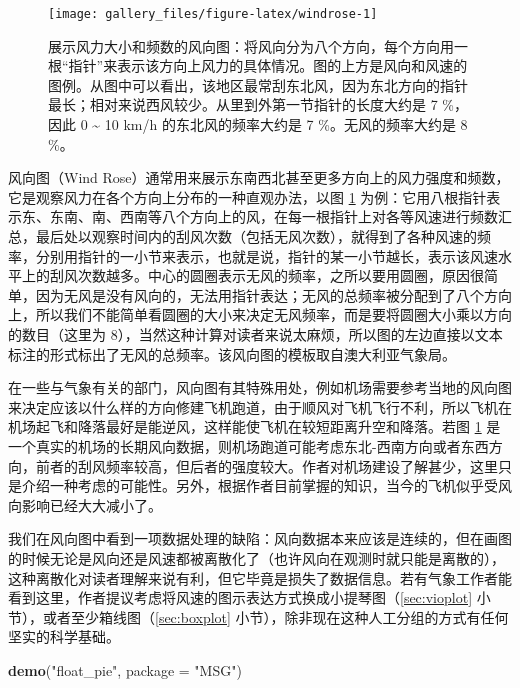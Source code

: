 \documentclass[
  b5paper,
  UTF8,twoside]{book}
\newenvironment{Shaded}{\begin{snugshade}}{\end{snugshade}}
\newcommand{\AttributeTok}[1]{\textcolor[rgb]{0.13,0.29,0.53}{#1}}
\newcommand{\FunctionTok}[1]{\textcolor[rgb]{0.13,0.29,0.53}{\textbf{#1}}}
\newcommand{\NormalTok}[1]{#1}
\newcommand{\StringTok}[1]{\textcolor[rgb]{0.31,0.60,0.02}{#1}}
\begin{document}
\begin{figure}

{\centering \texttt{[image: gallery\_files/figure-latex/windrose-1]} 

}

\caption[展示风力大小和频数的风向图]{展示风力大小和频数的风向图：将风向分为八个方向，每个方向用一根``指针''来表示该方向上风力的具体情况。图的上方是风向和风速的图例。从图中可以看出，该地区最常刮东北风，因为东北方向的指针最长；相对来说西风较少。从里到外第一节指针的长度大约是 7 \%，因此 0 \textasciitilde{} 10 km/h 的东北风的频率大约是 7 \%。无风的频率大约是 8 \%。}\label{fig:windrose}
\end{figure}

风向图（Wind Rose）通常用来展示东南西北甚至更多方向上的风力强度和频数，它是观察风力在各个方向上分布的一种直观办法，以图 \ref{fig:windrose}
为例：它用八根指针表示东、东南、南、西南等八个方向上的风，在每一根指针上对各等风速进行频数汇总，最后处以观察时间内的刮风次数（包括无风次数），就得到了各种风速的频率，分别用指针的一小节来表示，也就是说，指针的某一小节越长，表示该风速水平上的刮风次数越多。中心的圆圈表示无风的频率，之所以要用圆圈，原因很简单，因为无风是没有风向的，无法用指针表达；无风的总频率被分配到了八个方向上，所以我们不能简单看圆圈的大小来决定无风频率，而是要将圆圈大小乘以方向的数目（这里为 8），当然这种计算对读者来说太麻烦，所以图的左边直接以文本标注的形式标出了无风的总频率。该风向图的模板取自澳大利亚气象局。

在一些与气象有关的部门，风向图有其特殊用处，例如机场需要参考当地的风向图来决定应该以什么样的方向修建飞机跑道，由于顺风对飞机飞行不利，所以飞机在机场起飞和降落最好是能逆风，这样能使飞机在较短距离升空和降落。若图 \ref{fig:windrose} 是一个真实的机场的长期风向数据，则机场跑道可能考虑东北-西南方向或者东西方向，前者的刮风频率较高，但后者的强度较大。作者对机场建设了解甚少，这里只是介绍一种考虑的可能性。另外，根据作者目前掌握的知识，当今的飞机似乎受风向影响已经大大减小了。

我们在风向图中看到一项数据处理的缺陷：风向数据本来应该是连续的，但在画图的时候无论是风向还是风速都被离散化了（也许风向在观测时就只能是离散的），这种离散化对读者理解来说有利，但它毕竟是损失了数据信息。若有气象工作者能看到这里，作者提议考虑将风速的图示表达方式换成小提琴图（\ref{sec:vioplot} 小节），或者至少箱线图（\ref{sec:boxplot} 小节），除非现在这种人工分组的方式有任何坚实的科学基础。





\begin{Shaded}
\begin{Highlighting}[]
\FunctionTok{demo}\NormalTok{(}\StringTok{"float\_pie"}\NormalTok{, }\AttributeTok{package =} \StringTok{"MSG"}\NormalTok{)}
\end{Highlighting}
\end{Shaded}
\end{document}
